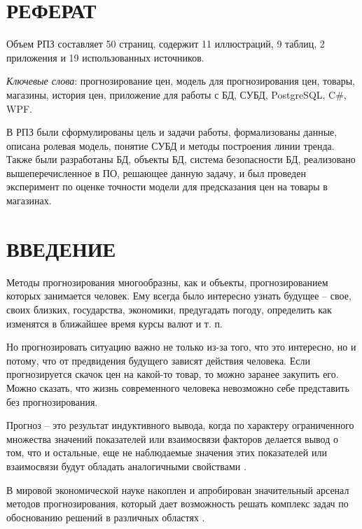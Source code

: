 \documentclass{bmstu}
\begin{document}
\setcounter{page}{3}

\chapter*{РЕФЕРАТ}

Объем РПЗ составляет 50 страниц, содержит 11 иллюстраций, 9 таблиц, 2 приложения и 19 использованных источников.

\textit{Ключевые слова}: прогнозирование цен, модель для прогнозирования цен, товары, магазины, история цен, приложение для работы с БД, СУБД, PostgreSQL, C\#, WPF.

В РПЗ были сформулированы цель и задачи работы, формализованы данные, описана ролевая модель, понятие СУБД и методы построения линии тренда. Также были разработаны БД, объекты БД, система безопасности БД, реализовано вышеперечисленное в ПО, решающее данную задачу, и был проведен эксперимент по оценке точности модели для предсказания цен на товары в магазинах.

\maketableofcontents

\chapter*{ВВЕДЕНИЕ}

Методы прогнозирования многообразны, как и объекты, прогнозированием которых занимается человек. Ему всегда было интересно узнать будущее -- свое, своих близких, государства, экономики, предугадать погоду, определить как изменятся в ближайшее время курсы валют и т. п.

Но прогнозировать ситуацию важно не только из-за того, что это интересно, но и потому, что от предвидения будущего зависят действия человека. Если прогнозируется скачок цен на какой-то товар, то можно заранее закупить его. Можно сказать, что жизнь современного человека невозможно себе представить без прогнозирования.

Прогноз -- это результат индуктивного вывода, когда по характеру ограниченного множества значений показателей или взаимосвязи факторов делается вывод о том, что и остальные, еще не наблюдаемые значения этих показателей или взаимосвязи будут обладать аналогичными свойствами \cite{hse-pred}.

В мировой экономической науке накоплен и апробирован значительный арсенал методов прогнозирования, который дает возможность решать комплекс задач по обоснованию решений в различных областях \cite{bel-prog}.
\end{document}
